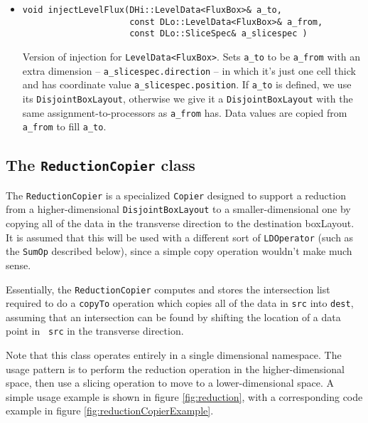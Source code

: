 \begin{itemize}
\item
\begin{verbatim}
void injectLevelFlux(DHi::LevelData<FluxBox>& a_to,
                     const DLo::LevelData<FluxBox>& a_from,
                     const DLo::SliceSpec& a_slicespec )
\end{verbatim}
Version of injection for {\tt LevelData<FluxBox>}. 
Sets \verb/a_to/ to be \verb/a_from/ with an extra dimension --
\verb/a_slicespec.direction/ -- in which it's just one cell thick and
has coordinate value \verb/a_slicespec.position/.
If \verb/a_to/ is defined, we use its {\tt DisjointBoxLayout},
otherwise we give it a {\tt DisjointBoxLayout} with the same
assignment-to-processors as \verb/a_from/ has. Data values are copied
from \verb/a_from/ to fill \verb/a_to/.


\end{itemize}

\subsection{The {\tt ReductionCopier} class}
The {\tt ReductionCopier} is a specialized {\tt Copier} designed to
support a reduction from a higher-dimensional {\tt DisjointBoxLayout}
to a smaller-dimensional one by copying all of the data in the
transverse direction to the destination boxLayout.  It is assumed that
this will be used with a different sort of {\tt LDOperator} (such as
the {\tt SumOp} described below), since a simple copy operation
wouldn't make much sense.  

Essentially, the {\tt ReductionCopier} computes and stores the
intersection list required to do a {\tt copyTo} operation which copies
all of the data in {\tt src} into {\tt dest}, assuming that an
intersection can be found by shifting the location of a data point in {\tt
  src} in the transverse direction.

Note that this class operates entirely in a single dimensional
namespace.  The usage pattern is to perform the reduction operation in
the higher-dimensional space, then use a slicing operation to move to a
lower-dimensional space.  A simple usage example is shown in figure 
\ref{fig:reduction}, with a corresponding code example in figure \ref{fig:reductionCopierExample}.  

